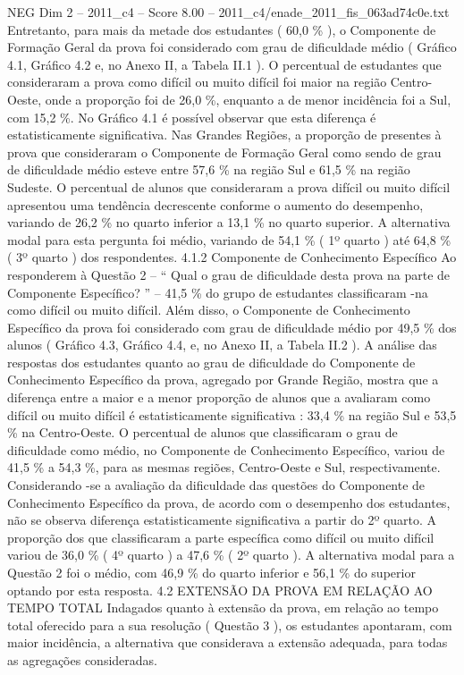 \begin{textsample}{NEG Dim 2 – 2011\_c4 – Score 8.00 – 2011\_c4/enade\_2011\_fis\_063ad74c0e.txt}
Entretanto, para mais da metade dos estudantes ( 60,0 \% ), o Componente de Formação Geral da prova foi considerado com grau de dificuldade médio ( Gráfico 4.1, Gráfico 4.2 e, no Anexo II, a Tabela II.1 ).
O percentual de estudantes que consideraram a prova como difícil ou muito difícil foi maior na região Centro-Oeste, onde a proporção foi de 26,0 \%, enquanto a de menor incidência foi a Sul, com 15,2 \%.
No Gráfico 4.1 é possível observar que esta diferença é estatisticamente significativa.
Nas Grandes Regiões, a proporção de presentes à prova que consideraram o Componente de Formação Geral como sendo de grau de dificuldade médio esteve entre 57,6 \% na região Sul e 61,5 \% na região Sudeste.
O percentual de alunos que consideraram a prova difícil ou muito difícil apresentou uma tendência decrescente conforme o aumento do desempenho, variando de 26,2 \% no quarto inferior a 13,1 \% no quarto superior.
A alternativa modal para esta pergunta foi médio, variando de 54,1 \% ( 1º quarto ) até 64,8 \% ( 3º quarto ) dos respondentes. 4.1.2 Componente de Conhecimento Específico Ao responderem à Questão 2 – “ Qual o grau de dificuldade desta prova na parte de Componente Específico? ” – 41,5 \% do grupo de estudantes classificaram -na como difícil ou muito difícil.
Além disso, o Componente de Conhecimento Específico da prova foi considerado com grau de dificuldade médio por 49,5 \% dos alunos ( Gráfico 4.3, Gráfico 4.4, e, no Anexo II, a Tabela II.2 ).
A análise das respostas dos estudantes quanto ao grau de dificuldade do Componente de Conhecimento Específico da prova, agregado por Grande Região, mostra que a diferença entre a maior e a menor proporção de alunos que a avaliaram como difícil ou muito difícil é estatisticamente significativa : 33,4 \% na região Sul e 53,5 \% na Centro-Oeste.
O percentual de alunos que classificaram o grau de dificuldade como médio, no Componente de Conhecimento Específico, variou de 41,5 \% a 54,3 \%, para as mesmas regiões, Centro-Oeste e Sul, respectivamente.
Considerando -se a avaliação da dificuldade das questões do Componente de Conhecimento Específico da prova, de acordo com o desempenho dos estudantes, não se observa diferença estatisticamente significativa a partir do 2º quarto.
A proporção dos que classificaram a parte específica como difícil ou muito difícil variou de 36,0 \% ( 4º quarto ) a 47,6 \% ( 2º quarto ).
A alternativa modal para a Questão 2 foi o médio, com 46,9 \% do quarto inferior e 56,1 \% do superior optando por esta resposta. 4.2 EXTENSÃO DA PROVA EM RELAÇÃO AO TEMPO TOTAL Indagados quanto à extensão da prova, em relação ao tempo total oferecido para a sua resolução ( Questão 3 ), os estudantes apontaram, com maior incidência, a alternativa que considerava a extensão adequada, para todas as agregações consideradas.

\end{textsample}
